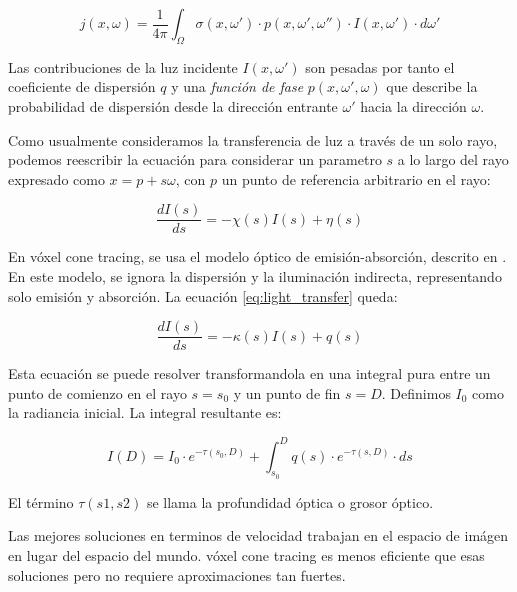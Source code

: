 \begin{equation}
    j(x, \omega) = \frac{1}{4\pi} \int_\Omega \sigma(x, \omega')\cdot p(x, \omega', \omega'')\cdot I(x, \omega')\cdot d\omega'
\end{equation}

Las contribuciones de la luz incidente $I(x, \omega')$ son pesadas por tanto el coeficiente de dispersión $q$ y una \textit{función de fase} $p(x, \omega', \omega)$ que describe la probabilidad de dispersión desde la dirección entrante $\omega'$ hacia la dirección $\omega$.

Como usualmente consideramos la transferencia de luz a través de un solo rayo, podemos reescribir la ecuación para considerar un parametro $s$ a lo largo del rayo expresado como $x = p + s\omega$, con $p$ un punto de referencia arbitrario en el rayo:

\begin{equation}\label{eq:light_transfer}
    \frac{dI(s)}{ds} = -\chi(s)I(s) + \eta(s)
\end{equation}

En vóxel cone tracing, se usa el modelo óptico de emisión-absorción, descrito en \cite{real-time-volume-graphics}.
En este modelo, se ignora la dispersión y la iluminación indirecta, representando solo emisión y absorción.
La ecuación \ref{eq:light_transfer} queda:

\begin{equation}
    \frac{dI(s)}{ds} = -\kappa(s)I(s) + q(s)
\end{equation}

Esta ecuación se puede resolver transformandola en una integral pura entre un punto de comienzo en el rayo $s = s_0$ y un punto de fin $s = D$.
Definimos $I_0$ como la radiancia inicial.
La integral resultante es:

\begin{equation}
    I(D) = I_0\cdot e^{-\tau(s_0, D)} + \int_{s_0}^D q(s)\cdot e^{-\tau(s, D)}\cdot ds
\end{equation}

El término $\tau(s1, s2)$ se llama la profundidad óptica o grosor óptico.

Las mejores soluciones en terminos de velocidad trabajan en el espacio de imágen en lugar del espacio del mundo.
vóxel cone tracing es menos eficiente que esas soluciones pero no requiere aproximaciones tan fuertes.

